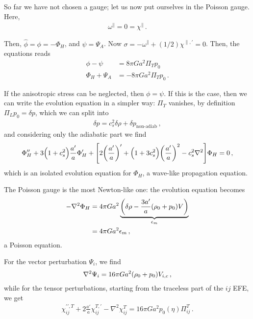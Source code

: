 \documentclass[main.tex]{subfiles}
\begin{document}
So far we have not chosen a gauge; let us now put ourselves in the Poisson gauge. Here, 
%
\begin{align}
\omega^{\parallel} = 0 = \chi^{\parallel}
\,.
\end{align}

Then, \(\hat{\phi} = \phi = - \Phi _H\), and \(\psi = \Psi _A\). 
Now \(\sigma = - \omega^{\parallel} + (1/2) \chi^{\parallel, \prime} = 0\). 
Then, the equations reads 
%
\begin{align}
\phi - \psi &= 8 \pi G a^2 \Pi_T p_0  \\
\Phi _H + \Psi _A  &= - 8 \pi G a^2 \Pi _T  p_0 
\,.
\end{align}

If the anisotropic stress can be neglected, then \(\phi = \psi \). 
If this is the case, then we can write the evolution equation in a simpler way: \(\Pi _T\) vanishes, by definition \(\Pi _L p_0 = \delta p\), which we can split into 
%
\begin{align}
\delta p = c_s^2 \delta \rho + \delta p _{\text{non-adiab}}
\,,
\end{align}
%
and considering only the adiabatic part we find 
%
\begin{align}
\Phi _H'' + 3 \qty(1 + c_s^2) \frac{a'}{a} \Phi _H' + 
\qty[2 \qty(\frac{a'}{a})' + \qty(1 + 3 c_s^2) \qty(\frac{a'}{a})^2
- c_s^2 \nabla^2] \Phi _H = 0
\,,
\end{align}
%
which is an isolated evolution equation for \(\Phi _H\), a wave-like propagation equation. 

The Poisson gauge is the most Newton-like one: the evolution equation becomes 
%
\begin{align}
- \nabla^2 \Phi _H &= 4 \pi G a^2 \underbrace{\qty(\delta \rho - \frac{3 a'}{a} (\rho_0 + p_0 )V )}_{\epsilon_{m}}  \\
&= 4 \pi G a^2\epsilon_m
\,,
\end{align}
%
a Poisson equation. 

For the vector perturbation \(\Psi_i\), we find 
%
\begin{align}
\nabla^2\Psi _i = 16 \pi G a^2 \qty(\rho_0 + p_0 ) V_{i, c}
\,,
\end{align}
%
while for the tensor perturbations, starting from the traceless part of the \(ij\) EFE, we get 
%
\begin{align}
\chi_{ij}^{\prime \prime, T} + 2 \frac{a'}{a} \chi^{T, \prime}_{ij} - \nabla^2 \chi^{T}_{ij} = 16 \pi G a^2p_0 (\eta ) \Pi^{T}_{ij}
\,.
\end{align}
\end{document}
